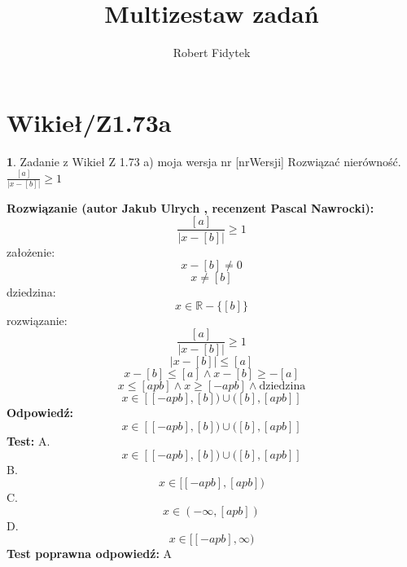 \documentclass[12pt, a4paper]{article}
\title{Multizestaw zadań}
\author{Robert Fidytek}
\date{}
\theoremstyle{definition} %
\newtheorem{zad}{}
\newcommand{\kategoria}[1]{\section{#1}} %
\newcommand{\zadStart}[1]{\begin{zad}#1\newline} %
\newcommand{\zadStop}{\end{zad}}   %
\newcommand{\rozwStart}[2]{\noindent \textbf{Rozwiązanie (autor #1 , recenzent #2): }\newline} %
\newcommand{\rozwStop}{\newline}                                            %
\newcommand{\odpStart}{\noindent \textbf{Odpowiedź:}\newline}    %
\newcommand{\odpStop}{\newline}                                             %
\newcommand{\testStart}{\noindent \textbf{Test:}\newline} %
\newcommand{\testStop}{\newline} %
\newcommand{\kluczStart}{\noindent \textbf{Test poprawna odpowiedź:}\newline} %
\newcommand{\kluczStop}{\newline} %
\begin{document}
\maketitle


\kategoria{Wikieł/Z1.73a}
\zadStart{Zadanie z Wikieł Z 1.73 a) moja wersja nr [nrWersji]}
Rozwiązać nierówność.$\frac{[a]}{|x-[b]|}\geq1$
\zadStop
\rozwStart{Jakub Ulrych}{Pascal Nawrocki}
$$\frac{[a]}{|x-[b]|}\geq1$$
założenie: $$x-[b]\neq0$$
$$x\neq[b]$$
dziedzina:$$x\in\mathbb{R}-\{[b]\}$$
rozwiązanie:$$\frac{[a]}{|x-[b]|}\geq1$$
$$|x-[b]|\leq[a]$$
$$x-[b]\leq[a]\land x-[b]\geq-[a]$$
$$x\leq[apb]\land x\geq[-apb]\land\text{dziedzina}$$
$$x\in[[-apb],[b])\cup([b],[apb]]$$
\rozwStop
\odpStart
$$x\in[[-apb],[b])\cup([b],[apb]]$$
\odpStop
\testStart
A.$$x\in[[-apb],[b])\cup([b],[apb]]$$
B.$$x\in[[-apb],[apb])$$
C.$$x\in(-\infty,[apb])$$
D.$$x\in[[-apb],\infty)$$
\testStop
\kluczStart
A
\kluczStop
\end{document}
